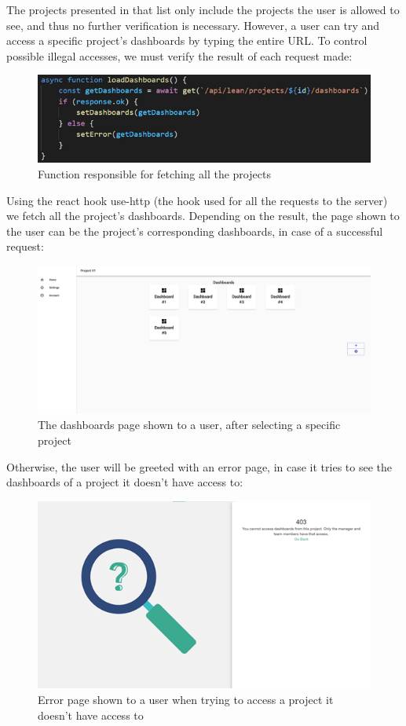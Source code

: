 \documentclass[a4paper,twoside,10pt]{report}
\begin{document}
The projects presented in that list only include the projects the user is allowed to see, and thus no further verification is necessary.
However, a user can try and access a specific project’s dashboards by typing the entire URL. To control possible illegal accesses, we must verify the result of each request made:
\begin{figure}[h!]
\center
  \includegraphics[width=\textwidth]{load-projects.png}
\caption{Function responsible for fetching all the projects}
\end{figure}

Using the react hook use-http (the hook used for all the requests to the server) we fetch all the project’s dashboards.
Depending on the result, the page shown to the user can be the project’s corresponding dashboards, in case of a successful request:
\begin{figure}[h!]
\center
  \includegraphics[width=\textwidth]{dashboardsPage.png}
\caption{The dashboards page shown to a user, after selecting a specific project}
\end{figure}

\newpage
Otherwise, the user will be greeted with an error page, in case it tries to see the dashboards of a project it doesn't have access to:

\begin{figure}[h!]
\center
  \includegraphics[width=\textwidth]{error-403.png}
\caption{Error page shown to a user when trying to access a project it doesn't have access to}
\end{figure}
\end{document}
